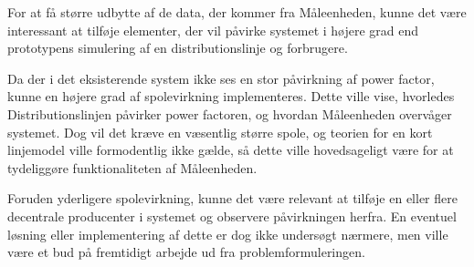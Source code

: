
For at få større udbytte af de data, der kommer fra Måleenheden, kunne det være interessant at tilføje elementer, der vil påvirke systemet i højere grad end prototypens simulering af en distributionslinje og forbrugere. 

Da der i det eksisterende system ikke ses en stor påvirkning af power factor, kunne en højere grad af spolevirkning implementeres. Dette ville vise, hvorledes Distributionslinjen påvirker power factoren, og hvordan Måleenheden overvåger systemet. Dog vil det kræve en væsentlig større spole, og teorien for en kort linjemodel ville formodentlig ikke gælde, så dette ville hovedsageligt være for at tydeliggøre funktionaliteten af Måleenheden. 

Foruden yderligere spolevirkning, kunne det være relevant at tilføje en eller flere decentrale producenter i systemet og observere påvirkningen herfra. En eventuel løsning eller implementering af dette er dog ikke undersøgt nærmere, men ville være et bud på fremtidigt arbejde ud fra problemformuleringen. 